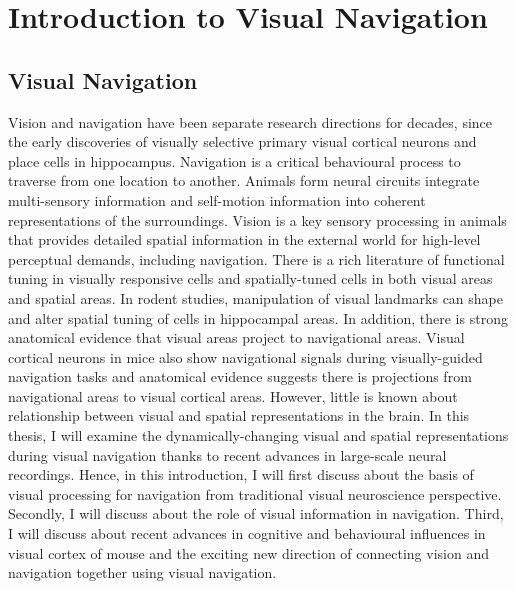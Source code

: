 \chapter{Introduction to Visual Navigation}
\label{chapterlabel1}

\section{Visual Navigation}
Vision and navigation have been separate research directions for decades, since the early discoveries of visually selective primary visual cortical neurons and place cells in hippocampus. Navigation is a critical behavioural process to traverse from one location to another. Animals form neural circuits integrate multi-sensory information and self-motion information into coherent representations of the surroundings. Vision is a key sensory processing in animals that provides detailed spatial information in the external world for high-level perceptual demands, including navigation. There is a rich literature of functional tuning in visually responsive cells and spatially-tuned cells in both visual areas and spatial areas. In rodent studies, manipulation of visual landmarks can shape and alter spatial tuning of cells in hippocampal areas. In addition, there is strong anatomical evidence that visual areas project to navigational areas. Visual cortical neurons in mice also show navigational signals during visually-guided navigation tasks and anatomical evidence suggests there is projections from navigational areas to visual cortical areas. However, little is known about relationship between visual and spatial representations in the brain. In this thesis, I will examine the dynamically-changing visual and spatial representations during visual navigation thanks to recent advances in large-scale neural recordings. Hence, in this introduction, I will first discuss about the basis of visual processing for navigation from traditional visual neuroscience perspective. Secondly, I will discuss about the role of visual information in navigation. Third, I will discuss about recent advances in cognitive and behavioural influences in visual cortex of mouse and the exciting new direction of connecting vision and navigation together using visual navigation.

